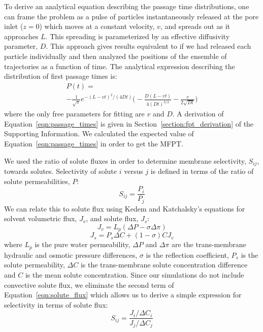 \documentclass[journal=ancac3,manuscript=article,layout=twocolumn]{achemso}
\begin{document}
  To derive an analytical equation describing the passage time distributions,
  one can frame the problem as a pulse of particles instantaneously released at
  the pore inlet ($z=0$) which moves at a constant velocity, $v$, and spreads
  out as it approaches $L$. This spreading is parameterized by an effective
  diffusivity parameter, $D$. This approach gives results equivalent to if we
  had released each particle individually and then analyzed the positions of
  the ensemble of trajectories as a function of time. The analytical expression
  describing the distribution of first passage times
  is:~\cite{cussler_diffusion:_2009}
  \begin{equation}
  \begin{split}
  P(t) =~~~~~~~~~~~~~~~~~~~~~~~~~~~~~~~~~~~~~~~~~~~~~~~~~~~~~~~\\
  -\frac{1}{\sqrt{\pi}}e^{-(L - vt)^2 / (4Dt)}\bigg(-\frac{D(L - vt)}{4(Dt)^{3/2}} - \frac{v}{2\sqrt{Dt}}\bigg)
  \end{split}
  \label{eqn:passage_times}
  \end{equation} 
  where the only free parameters for fitting are $v$ and $D$. A derivation of
  Equation~\ref{eqn:passage_times} is given in
  Section~\ref{section:fpt_derivation} of the Supporting Information. We
  calculated the expected value of Equation~\ref{eqn:passage_times} in order to
  get the MFPT.

  We used the ratio of solute fluxes in order to determine membrane
  selectivity, $S_{ij}$, towards solutes. Selectivity of solute $i$ versus $j$
  is defined in terms of the ratio of solute permeabilities,
  $P$:~\cite{guo_pervaporation_2004}
  \begin{equation}
  S_{ij} = \frac{P_i}{P_j}
  \end{equation}
  We can relate this to solute flux using Kedem and Katchalsky's equations for
  solvent volumetric flux, $J_v$, and solute flux,
  $J_s$:~\cite{kedem_permeability_1963,al-zoubi_rejection_2007}
  \begin{equation}
  J_v = L_p(\Delta P - \sigma\Delta \pi)
  \end{equation} 
  \begin{equation}
  J_s = P_s \Delta C + (1 - \sigma)CJ_v
  \label{eqn:solute_flux}
  \end{equation}
  where $L_p$ is the pure water permeability, $\Delta P$ and $\Delta \pi$ are
  the trans-membrane hydraulic and osmotic pressure differences, $\sigma$ is
  the reflection coefficient, $P_s$ is the solute permeability, $\Delta C$ is
  the trans-membrane solute concentration difference and $C$ is the mean solute
  concentration. Since our simulations do not include convective solute flux,
  we eliminate the second term of Equation~\ref{eqn:solute_flux} which allows
  us to derive a simple expression for selectivity in terms of solute flux:
  \begin{equation}
  S_{ij} = \frac{J_i / \Delta C_i}{J_j / \Delta C_j}
  \label{eqn:selectivity}
  \end{equation}
  
\end{document}
